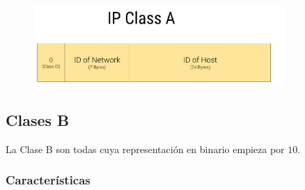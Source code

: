 \documentclass[12pt, fleqn]{report}                             %
\theoremstyle{break}                                            %
\begin{document}
                \begin{figure}[h]
                    \centering
                    \includegraphics[width=0.85\textwidth]{ClassA}
                \end{figure}


            \clearpage
            \subsection{Clases B}

                La Clase B son todas cuya representación en binario empieza por $10$.


                \subsubsection{Características}
                
\end{document}
